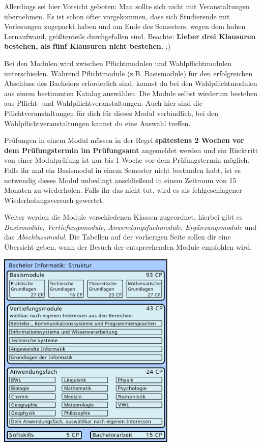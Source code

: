 Allerdings sei hier Vorsicht geboten: Man sollte sich nicht mit Veranstaltungen übernehmen. Es ist schon öfter vorgekommen, dass sich Studierende mit Vorlesungen zugepackt haben und am Ende des Semesters, wegen dem hohen Lernaufwand, größtenteils durchgefallen sind. Beachte: \textbf{Lieber drei Klausuren bestehen, als fünf Klausuren nicht bestehen.} ;)

Bei den Modulen wird zwischen Pflichtmodulen und Wahlpflichtmodulen unterschieden. Während Pflichtmodule (z.B. Basismodule) für den erfolgreichen Abschluss des Bachelors erforderlich sind, kannst du bei den Wahlpflichtmodulen aus einem bestimmten Katalog auswählen. Die Module selbst wiederum bestehen aus Pflicht- und Wahlpflichtveranstaltungen. Auch hier sind die Pflichtveranstaltungen für dich für dieses Modul verbindlich, bei den Wahlpflichtveranstaltungen kannst du eine Auswahl treffen. 

Prüfungen in einem Modul müssen in der Regel \textbf{spätestens 2 Wochen vor dem  Prüfungstermin im Prüfungsamt} angemeldet werden und ein Rücktritt von einer Modulprüfung ist nur bis 1 Woche vor dem Prüfungstermin möglich. Falls ihr mal ein Basismodul in einem Semester nicht bestanden habt, ist es notwendig dieses Modul unbedingt anschließend in einem Zeitraum von 15 Monaten zu wiederholen. Falls ihr das nicht tut, wird es als fehlgeschlagener Wiederholungsversuch gewertet.

Weiter werden die Module verschiedenen Klassen zugeordnet, hierbei gibt es \emph{Basismodule}, \emph{Vertiefungsmodule}, \emph{Anwendungsfachmodule}, \emph{Ergänzungsmodule} und das \emph{Abschlussmodul}. Die Tabellen auf der vorherigen Seite sollen dir eine Übersicht geben, wann der Besuch der entsprechenden Module empfohlen wird.

\begin{center}
	\includegraphics[width=85mm]{bitmaps/bachelor/BacInfStruktur}
\end{center}

